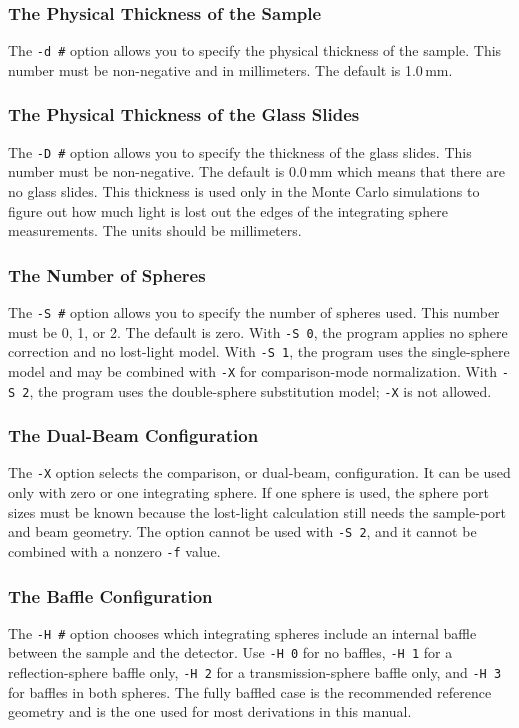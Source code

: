 \documentclass{article}
\begin{document}
\subsubsection{The Physical Thickness of the Sample}
The \texttt{-d \#} option allows you to specify the physical thickness of
the sample.  This number must be non-negative and in millimeters.  The default is 1.0\,mm.

\subsubsection{The Physical Thickness of the Glass Slides}
The \texttt{-D \#} option allows you to specify the thickness of
the glass slides.  This number must be non-negative.  The default is 0.0\,mm
which means that there are no glass slides.  This thickness is used
only in the Monte Carlo simulations to figure out how much light is lost
out the edges of the integrating sphere measurements.  The units should be
millimeters.

\subsubsection{The Number of Spheres}
The \texttt{-S \#} option allows you to specify the number of spheres used.
This number must be 0, 1, or 2.  The default is zero.  With \texttt{-S 0},
the program applies no sphere correction and no lost-light model.  With
\texttt{-S 1}, the program uses the single-sphere model and may be combined
with \texttt{-X} for comparison-mode normalization.  With \texttt{-S 2}, the
program uses the double-sphere substitution model; \texttt{-X} is not allowed.

\subsubsection{The Dual-Beam Configuration}
The \texttt{-X} option selects the comparison, or dual-beam, configuration.
It can be used only with zero or one integrating sphere.  If one sphere is used,
the sphere port sizes must be known because the lost-light calculation still
needs the sample-port and beam geometry.  The option cannot be used with
\texttt{-S 2}, and it cannot be combined with a nonzero \texttt{-f} value.

\subsubsection{The Baffle Configuration}
The \texttt{-H \#} option chooses which integrating spheres include an internal
baffle between the sample and the detector.  Use \texttt{-H 0} for no baffles,
\texttt{-H 1} for a reflection-sphere baffle only, \texttt{-H 2} for a
transmission-sphere baffle only, and \texttt{-H 3} for baffles in both spheres.
The fully baffled case is the recommended reference geometry and is the one used
for most derivations in this manual.
\end{document}
